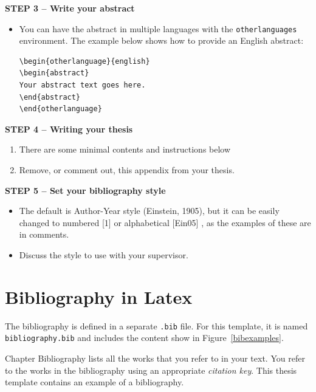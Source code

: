 {\textbf{STEP 3 -- Write your abstract}}

\begin{itemize}
\item You can have the abstract in multiple languages with the \texttt{otherlanguages} environment. The example below shows how to provide an English abstract: 

\begin{verbatim}
\begin{otherlanguage}{english} 
\begin{abstract}
Your abstract text goes here. 
\end{abstract} 
\end{otherlanguage}
\end{verbatim}

\end{itemize}

{\textbf{STEP 4 -- Writing your thesis}}

\begin{enumerate}
\item There are some minimal contents and instructions below 
\item Remove, or comment out, this appendix from your thesis.
\end{enumerate}

{\textbf{STEP 5 -- Set your bibliography style}}

\begin{itemize}
\item The default is Author-Year style (Einstein, 1905), but it can be easily changed to numbered [1] or alphabetical [Ein05] , as the examples of these are in comments.
\item Discuss the style to use with your supervisor.
\end{itemize}

\section{Bibliography in Latex}

The bibliography is defined in a separate \texttt{.bib} file. For this template, it is named \texttt{bibliography.bib} and includes the content show in Figure~\ref{bibexamples}.

Chapter Bibliography lists all the works that you refer to in your text. You refer to the works in the bibliography using an appropriate \emph{citation key}.
%
This thesis template contains an example of a bibliography.



